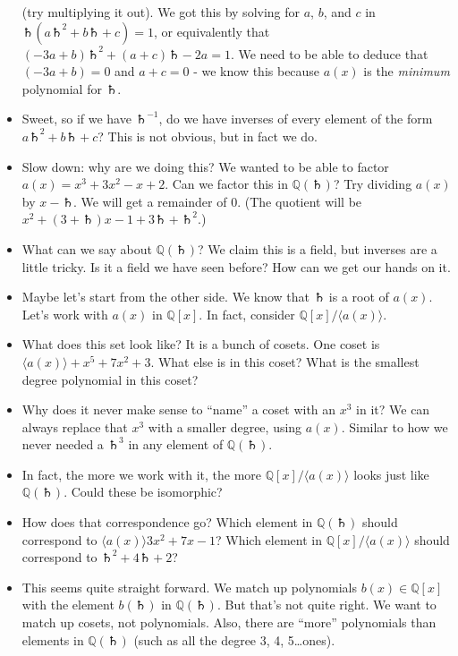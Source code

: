 \documentclass[12pt]{article}
\def\a{\Saturn}
\theoremstyle{plain}
\theoremstyle{definition}
\theoremstyle{remark}
\def\Q{\mathbb Q}
\def\inv{^{-1}}
\begin{document}
\begin{itemize}
(try multiplying it out).  We got this by solving for $a$, $b$, and $c$ in $\a(a\a^2 + b\a + c) = 1$, or equivalently that $(-3a+b)\a^2 + (a+c)\a - 2a = 1$.  We need to be able to deduce that $(-3a+b) = 0$ and $a+c = 0$ - we know this because $a(x)$ is the {\em minimum} polynomial for $\a$.
\item Sweet, so if we have $\a\inv$, do we have inverses of every element of the form $a\a^2 + b\a + c$?  This is not obvious, but in fact we do.  
\item Slow down: why are we doing this?  We wanted to be able to factor $a(x) = x^3 + 3x^2 - x + 2$.  Can we factor this in $\Q(\a)$?  Try dividing $a(x)$ by $x-\a$.  We will get a remainder of 0.  (The quotient will be $x^2 + (3+\a)x - 1 + 3\a + \a^2$.)



\item What can we say about $\Q(\a)$?  We claim this is a field, but inverses are a little tricky.  Is it a field we have seen before?  How can we get our hands on it.

\item Maybe let's start from the other side.  We know that $\a$ is a root of $a(x)$.  Let's work with $a(x)$ in $\Q[x]$. In fact, consider $\Q[x]/\langle a(x)\rangle$.

\item What does this set look like?  It is a bunch of cosets.  One coset is $\langle a(x)\rangle + x^5 + 7x^2 + 3$.  What else is in this coset?  What is the smallest degree polynomial in this coset?

\item Why does it never make sense to ``name'' a coset with an $x^3$ in it?  We can always replace that $x^3$ with a smaller degree, using $a(x)$.  Similar to how we never needed a $\a^3$ in any element of $\Q(\a)$.

\item In fact, the more we work with it, the more $\Q[x]/\langle a(x)\rangle$ looks just like $\Q(\a)$.  Could these be isomorphic?

\item How does that correspondence go?  Which element in $\Q(\a)$ should correspond to $\langle a(x)\rangle 3x^2 + 7x - 1$?  Which element in $\Q[x]/\langle a(x) \rangle$ should correspond to $\a^2 +4\a + 2$?

\item This seems quite straight forward.  We match up polynomials $b(x) \in \Q[x]$ with the element $b(\a)$ in $\Q(\a)$.  But that's not quite right.  We want to match up cosets, not polynomials.  Also, there are ``more'' polynomials than elements in $\Q(\a)$ (such as all the degree 3, 4, 5\ldots ones).


\end{itemize}
\end{document}
